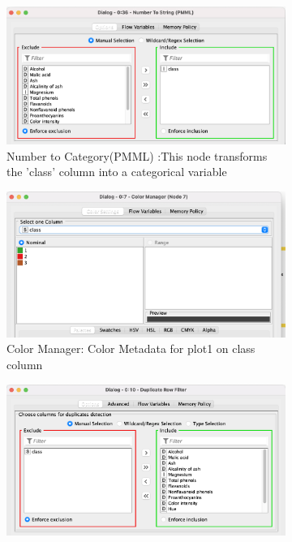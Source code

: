\documentclass[11pt]{article}
\begin{document}
			\begin{figure}[H]
				\centering
				\begin{subfigure}{0.4\textwidth}
					\includegraphics[width=\textwidth]{res/t1/t11/t11-number-to-cat-conf}
					\caption{Number to Category(PMML) :This node transforms the 'class' column into a categorical variable }
					\label{fig:first}
				\end{subfigure}
				\hfill
				\begin{subfigure}{0.4\textwidth}
					\includegraphics[width=\textwidth]{res/t1/t11/t11-color-manager-conf}
					\caption{Color Manager: Color Metadata for plot1 on class column}
					\label{fig:second}
				\end{subfigure}
				\hfill
				\begin{subfigure}{0.4\textwidth}
					\includegraphics[width=\textwidth]{res/t1/t11/t11-duplicate-row-conf}

\end{subfigure}
\end{figure}
\end{document}
